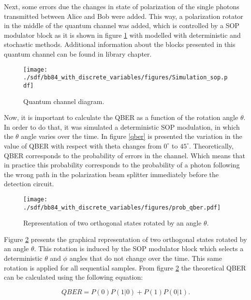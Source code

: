 \begin{refsection}
Next, some errors due the changes in state of polarization of the single photons transmitted between Alice and Bob were added. This way, a polarization rotator in the middle of the quantum channel was added, which is controlled by a SOP modulator block as it is shown in figure \ref{sop_channel} with modelled with deterministic \cite{Muga15} and stochastic \cite{Czegledi16} methods. Additional information about the blocks presented in this quantum channel can be found in library chapter.

\begin{figure}[h]
    \centering
        \texttt{[image: ./sdf/bb84\_with\_discrete\_variables/figures/Simulation\_sop.pdf]}
    \caption{Quantum channel diagram. }\label{sop_channel}
\end{figure}

Now, it is important to calculate the QBER as a function of the rotation angle $\theta$. In order to do that, it was simulated a deterministic SOP modulation, in which the $\theta$ angle varies over the time. In figure \ref{qber} is presented the variation in the value of QBER with respect with theta changes from $0^\circ$ to $45^\circ$. Theoretically, QBER corresponds to the probability of errors in the channel. Which means that in practice this probability corresponds to the probability of a photon following the wrong path in the polarization beam splitter immediately before the detection circuit.

\begin{figure}[h]
    \centering
        \texttt{[image: ./sdf/bb84\_with\_discrete\_variables/figures/prob\_qber.pdf]}
    \caption{Representation of two orthogonal states rotated by an angle $\theta$.}\label{rep_rotation}
\end{figure}

Figure \ref{rep_rotation} presents the graphical representation of two orthogonal states rotated by an angle $\theta$. This rotation is induced by the SOP modulator block which selects a deterministic $\theta$ and $\phi$ angles that do not change over the time. This same rotation is applied for all sequential samples. From figure \ref{rep_rotation} the theoretical QBER can be calculated using the following equation:

\begin{equation}\label{eq:qber}
  QBER = P(0)P(1|0)+P(1)P(0|1).
\end{equation}


\end{refsection}
